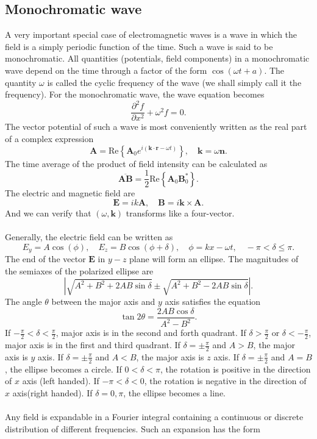 \subsection{Monochromatic wave}
A very important special case of electromagnetic waves is a wave in which the field is a simply periodic function of the time. Such a wave is said to be monochromatic. All quantities
(potentials, field components) in a monochromatic wave depend on the time through a factor of the form $\cos(\omega t + a)$. The quantity $\omega$ is called the cyclic frequency of the wave (we shall simply call it the frequency). For the monochromatic wave, the wave equation becomes
\[\frac{\partial^2 f}{\partial x^2} +	 \omega^2 f = 0.\]
The vector potential of such a wave is most conveniently written as the real part of a complex expression
\[\bm{A} = \mathrm{Re}\left\{ \bm{A}_0 e^{i(\bm{k}\cdot\bm{r}-\omega t)}\right\} , \quad \bm{k} = \omega \bm{n}.\]
The time average of the product of field intensity can be calculated as
\[\overline{\bm{A}\bm{B}} = \frac{1}{2}\mathrm{Re}\left\{ \bm{A}_0 \bm{B}_0^*\right\}.\]
The electric and magnetic field are
\[\bm{E} = ik\bm{A} , \quad \bm{B} = i\bm{k}\times\bm{A}.\]
And we can verify that $(\omega,\bm{k})$ transforms like a four-vector.
\\ \\
Generally, the electric field can be  written as
\[E_y = A\cos(\phi) , \quad E_z = B\cos(\phi + \delta) , \quad \phi= kx -\omega t   , \quad -\pi < \delta \leq \pi.\]
The end of the vector $\bm{E}$ in $y-z$ plane will form an ellipse. The magnitudes of the semiaxes of the polarized ellipse are
\[|\sqrt{A^2+B^2+2AB\sin\delta} \pm \sqrt{A^2+B^2-2AB\sin\delta}|.\]
The angle $\theta$ between the major axis and $y$ axis satisfies the equation
\[\tan 2\theta = \frac{2AB\cos\delta}{A^2-B^2}.\]
If $-\frac{\pi}{2} < \delta < \frac{\pi}{2}$, major axis is in the second and forth quadrant. If $\delta > \frac{\pi}{2}$ or $\delta < -\frac{\pi}{2}$, major axis is in the first and third quadrant. If $\delta = \pm \frac{\pi}{2}$ and $A>B$, the major axis is $y$ axis. If $\delta = \pm \frac{\pi}{2}$ and $A<B$, the major axis is $z$ axis. If $\delta = \pm \frac{\pi}{2}$ and $A=B$, the ellipse becomes a circle.
If $0 < \delta < \pi$, the rotation is positive in the direction of $x$ axis (left handed). If $-\pi < \delta < 0$, the rotation is negative in the direction of $x$ axis(right handed). If $\delta = 0,\pi$, the ellipse becomes a line.\\ \\
Any field is expandable in a Fourier integral containing a continuous or discrete distribution of different frequencies. Such an expansion has the form
